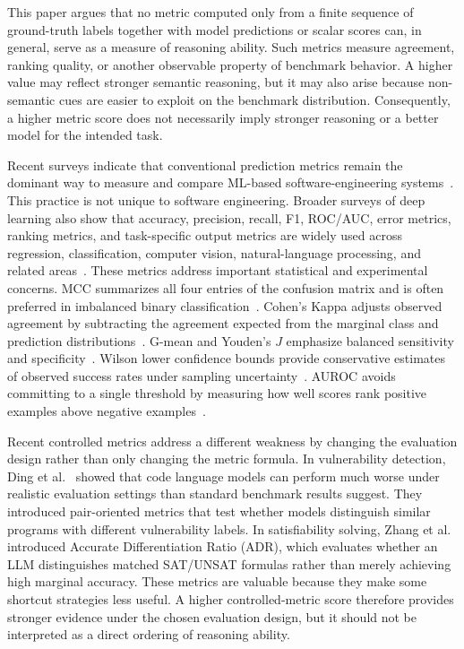 \documentclass[acmsmall,screen,review,anonymous]{acmart}
\newcounter{experiment}
\begin{document}
This paper argues that no metric computed only from a finite sequence of
ground-truth labels together with model predictions or scalar scores can, in
general, serve as a measure of reasoning ability. Such metrics measure
agreement, ranking quality, or another observable property of benchmark
behavior. A higher value may reflect stronger semantic reasoning, but it may
also arise because non-semantic cues are easier to exploit on the benchmark
distribution. Consequently, a higher metric score does not necessarily imply
stronger reasoning or a better model for the intended task.

Recent surveys indicate that conventional prediction metrics remain the
dominant way to measure and compare ML-based software-engineering
systems~\cite{Shen2020survey,Watson2022systematic,Sheng2025llms,Kalouptsoglou2023software,Yang2022DL4SE,Zhang2026LLM4SE}.
This practice is not unique to software engineering. Broader surveys of deep
learning also show that accuracy, precision, recall, F1, ROC/AUC, error
metrics, ranking metrics, and task-specific output metrics are widely used
across regression, classification, computer vision, natural-language
processing, and related areas~\cite{Terven2025LossMetrics}. These metrics
address important statistical and experimental concerns. MCC summarizes all
four entries of the confusion matrix and is often preferred in imbalanced
binary classification~\cite{Matthews1975MCC,ChiccoJurman2020MCC}. Cohen's
Kappa adjusts observed agreement by subtracting the agreement expected from
the marginal class and prediction distributions~\cite{Cohen1960Kappa}.
G-mean and Youden's \(J\) emphasize balanced sensitivity and
specificity~\cite{Youden1950Index,HeGarcia2009Imbalanced}. Wilson lower
confidence bounds provide conservative estimates of observed success rates
under sampling uncertainty~\cite{Wilson1927Interval}. AUROC avoids committing
to a single threshold by measuring how well scores rank positive examples
above negative examples~\cite{Fawcett2006ROC}.

Recent controlled metrics address a different weakness by changing the
evaluation design rather than only changing the metric formula. In
vulnerability detection, Ding et al.~\cite{VDCL:Ding:2024} showed that code
language models can perform much worse under realistic evaluation settings
than standard benchmark results suggest. They introduced pair-oriented
metrics that test whether models distinguish similar programs with different
vulnerability labels. In satisfiability solving, Zhang et
al.~\cite{Zhang2026SAT} introduced Accurate Differentiation Ratio (ADR),
which evaluates whether an LLM distinguishes matched SAT/UNSAT formulas
rather than merely achieving high marginal accuracy. These metrics are
valuable because they make some shortcut strategies less useful. A higher
controlled-metric score therefore provides stronger evidence under the chosen
evaluation design, but it should not be interpreted as a direct ordering of
reasoning ability.
\end{document}
